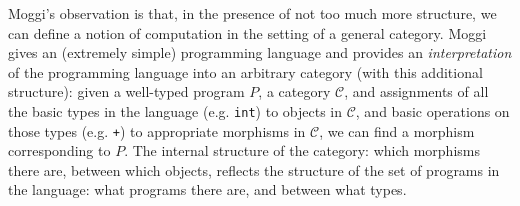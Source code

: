 \documentclass{article}
\renewcommand{\[}{\begin{eqnarray*}}
\renewcommand{\]}{\end{eqnarray*}}
\theoremstyle{definition}
\begin{document}
Moggi's observation is that, in the presence of not too much more
structure, we can define a notion of computation in the setting of a general
category. Moggi gives an (extremely simple) programming language and provides an
\emph{interpretation} of the programming language into an arbitrary category
(with this additional structure): given a well-typed program $P$, a category
$\mathcal C$, and assignments of all the basic types in the language (e.g.
\texttt{int}) to objects in $\mathcal C$, and basic operations on those types
(e.g. \texttt{+}) to appropriate morphisms in $\mathcal C$, we can find a
morphism corresponding to $P$. The internal structure of the category: which
morphisms there are, between which objects, reflects the structure of the set of
programs in the language: what programs there are, and between what types.
\end{document}
